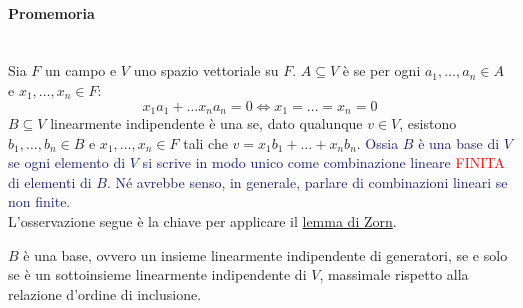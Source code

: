 \paragraph*{Promemoria}\mbox{}\\
Sia $F$ un campo e $V$ uno spazio vettoriale su $F$. $A \subseteq V$ \`e  se per ogni $a_1,\ldots,a_n \in A$ e $x_1,\ldots,x_n \in F$:
\[ x_1a_1 + \ldots x_na_n = 0 \iff x_1 = \ldots = x_n = 0
	\]
$B \subseteq V$ linearmente indipendente \`e una  se, dato qualunque $v \in V$, esistono $b_1,\ldots,b_n \in B$ e $x_1,\ldots,x_n \in F$ tali che $v = x_1b_1+\ldots+x_nb_n$.
\textcolor{MidnightBlue}{Ossia $B$ \`e una base di $V$ se ogni elemento di $V$ si scrive in modo unico come combinazione lineare \textcolor{red}{FINITA} di elementi di $B$. N\'e avrebbe senso, in generale, parlare di combinazioni lineari se non finite.}\\

L'osservazione segue \`e la chiave per applicare il \hyperref[Zorn]{lemma di Zorn}.

\begin{remark}
	$B$ \`e una base, ovvero un insieme linearmente indipendente di generatori, se e solo se \`e un sottoinsieme linearmente indipendente di $V$, massimale rispetto alla relazione d'ordine di inclusione.
\end{remark}

